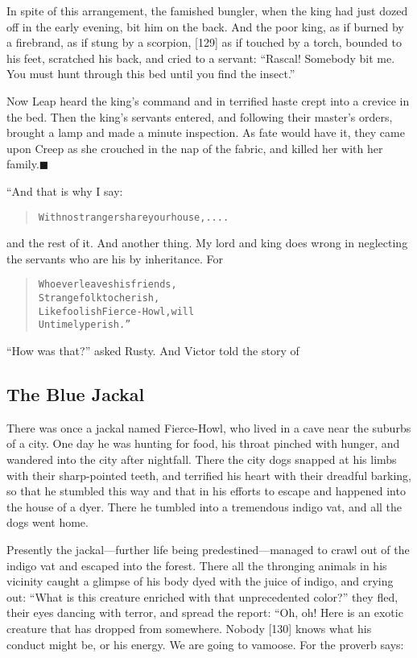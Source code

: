 \documentclass[article, twoside, 14pt]{memoir}
\newcommand{\qed}{\hfill \ensuremath{\blacksquare}}
\renewenvironment{verbatim}{%
\begin{quote}%
\vskip -10pt%
\begin{alltt}\normalfont\large}{\end{alltt}%
\end{quote}%
\vskip -10pt
} %
\begin{document}
In spite of this arrangement, the famished bungler, when the king
had just dozed off in the early evening, bit him on the back. And
the poor king, as if burned by a firebrand, as if stung by a
scorpion, [129] as if touched by a torch, bounded to his feet,
scratched his back, and cried to a servant:
``Rascal! Somebody bit me. You must hunt through this bed until you find the insect.''

Now Leap heard the king's command and in terrified haste crept into
a crevice in the bed. Then the king's servants entered, and
following their master's orders, brought a lamp and made a minute
inspection. As fate would have it, they came upon Creep as she
crouched in the nap of the fabric, and killed her with her
family.\hyperref[s13]{\qed}

“And that is why I say:

\begin{verbatim}
With no stranger share your house, ....
\end{verbatim}
and the rest of it. And another thing. My lord and king does wrong
in neglecting the servants who are his by inheritance. For

\begin{verbatim}
Whoever leaves his friends,
    Strange folk to cherish,
Like foolish Fierce-Howl, will
    Untimely perish.”
\end{verbatim}
``How was that?'' asked Rusty. And Victor told the story of

\subsection{The Blue Jackal}

\label{s14}

There was once a jackal named Fierce-Howl, who lived in a cave near
the suburbs of a city. One day he was hunting for food, his throat
pinched with hunger, and wandered into the city after nightfall.
There the city dogs snapped at his limbs with their sharp-pointed
teeth, and terrified his heart with their dreadful barking, so that
he stumbled this way and that in his efforts to escape and happened
into the house of a dyer. There he tumbled into a tremendous indigo
vat, and all the dogs went home.

Presently the jackal---further life being predestined---managed to
crawl out of the indigo vat and escaped into the forest. There all
the thronging animals in his vicinity caught a glimpse of his body
dyed with the juice of indigo, and crying out:
``What is this creature enriched with that unprecedented color?''
they fled, their eyes dancing with terror, and spread the report:
“Oh, oh! Here is an exotic creature that has dropped from
somewhere. Nobody [130] knows what his conduct might be, or his
energy. We are going to vamoose. For the proverb says:
\end{document}
